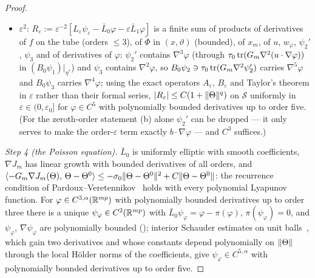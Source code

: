 \begin{proof}
\begin{itemize}
    $\bar L_1\varphi := b\cdot\nabla\varphi$.
  \item $\varepsilon^2$: $R_\varepsilon := \varepsilon^{-2}[L_\varepsilon\psi_\varepsilon - \bar L_0\varphi
    - \varepsilon\bar L_1\varphi]$ is a finite sum of products of derivatives of $f$ on the tube (orders $\le3$), of
    $\tilde\Phi$ in $(x,\vartheta)$ (bounded), of $x_m$, of $u$, $w_\varphi$, $\psi_2'$, $\psi_3$ and of derivatives
    of $\varphi$: $\psi_2'$ contains $\nabla^3\varphi$ (through $\tau_0\operatorname{tr}(G_m\nabla^2(u\cdot\nabla\varphi))$ in
    $(B_0\psi_1)|_{\eta^*}$) and $\psi_3$ contains $\nabla^2\varphi$, so $B_0\psi_2\ni\tau_0\operatorname{tr}(G_m\nabla^2\psi_2')$
    carries $\nabla^5\varphi$ and $B_0\psi_3$ carries $\nabla^4\varphi$; using the exact operators $A_\varepsilon$,
    $B_\varepsilon$ and Taylor's theorem in $\varepsilon$ rather than their formal series,
    $\lvert R_\varepsilon\rvert\le C(1 + \lVert \Theta\rVert^q)$ on $\mathcal{S}$ uniformly in $\varepsilon\in(0,\varepsilon_0]$
    for $\varphi\in C^5$ with polynomially bounded derivatives up to order five. (For the zeroth-order statement (b)
    alone $\psi_2'$ can be dropped --- it only serves to make the order-$\varepsilon$ term exactly
    $b\cdot\nabla\varphi$ --- and $C^3$ suffices.)
\end{itemize}

\smallskip
\emph{Step 4 (the Poisson equation).} $\bar L_0$ is uniformly elliptic with smooth coefficients, $\nabla J_m$ has
linear growth with bounded derivatives of all orders, and
$\langle -G_m\nabla J_m(\Theta),\, \Theta - \Theta^0\rangle\le-\sigma_0\lVert \Theta - \Theta^0\rVert^2 + C\lVert \Theta - \Theta^0\rVert$:
the recurrence condition of Pardoux--Veretennikov~\cite[Thm~1]{S23} holds with every polynomial Lyapunov function.
For $\varphi\in C^{3,\alpha}(\mathbb{R}^{mp})$ with polynomially bounded derivatives up to order three there is a unique
$\psi_\varphi\in C^2(\mathbb{R}^{mp})$ with $\bar L_0\psi_\varphi = \varphi - \pi(\varphi)$, $\pi(\psi_\varphi) = 0$, and
$\psi_\varphi$, $\nabla\psi_\varphi$ are polynomially bounded (\cite[Thm~1 and 2]{S23}); interior Schauder estimates
on unit balls~\cite[Thm~6.2 and 6.17]{S24}, which gain two derivatives and whose constants depend polynomially on
$\lVert \Theta\rVert$ through the local H\"older norms of the coefficients, give $\psi_\varphi\in C^{5,\alpha}$ with
polynomially bounded derivatives up to order five.


\end{proof}
